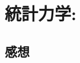 \documentclass[../../sp_2017.tex]{subfiles}
\begin{document}
\setcounter{section}{1}
\section{統計力学:}


\subsection*{感想}
\end{document}

